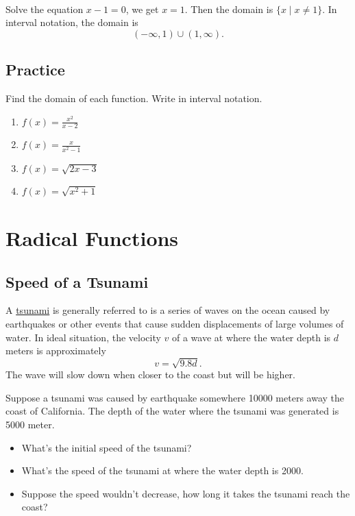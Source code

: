 \documentclass[en,11pt]{elegantbook}
\newcommand{\size}[2]{{\fontsize{#1}{0}\selectfont#2}}
\newenvironment{rmdthink}{
	\vspace*{0.5\baselineskip}
	\par\noindent
	\makebox[-4pt][r]{\color{green!90}\size{12}{\faLightbulbO}\,\,}
    \begin{tcolorbox}[
    enhanced,
    title={\textbf{\color{second}Think}},
    title style={left color=blue!10!green!20!white,right color=yellow!20!blue!20!white},
    colback=green!20!white,
    ]
    \sffamily
}{
    \end{tcolorbox}
	\par\ignorespacesafterend
}
\let\BeginKnitrBlock\begin \let\EndKnitrBlock\end
\begin{document}
\BeginKnitrBlock{solution}
{}\\

Solve the equation \(x-1=0\), we get \(x=1\). Then the domain is \(\{x\mid x\neq 1\}\). In interval notation, the domain is
\[
(-\infty, 1)\cup (1,\infty).
\]
\EndKnitrBlock{solution}

\newpage

\hypertarget{practice-13}{%
\section{Practice}\label{practice-13}}

\BeginKnitrBlock{exercise}
\protect\hypertarget{exr:unnamed-chunk-273}{}{\label{exr:unnamed-chunk-273} }
Find the domain of each function. Write in interval notation.

\begin{enumerate}
\def\labelenumi{\arabic{enumi}.}

\item
  \(f(x)=\frac{x^2}{x-2}\)
\item
  \(f(x)=\frac{x}{x^2-1}\)
\item
  \(f(x)=\sqrt{2x-3}\)
\item
  \(f(x)=\sqrt{x^2+1}\)\hfill\null
\end{enumerate}
\EndKnitrBlock{exercise}

\hypertarget{radical-functions}{%
\chapter{Radical Functions}\label{radical-functions}}

\hypertarget{speed-of-a-tsunami}{%
\section{Speed of a Tsunami}\label{speed-of-a-tsunami}}

\begin{rmdthink}

A \href{https://en.wikipedia.org/wiki/Tsunami}{tsunami} is generally referred to is a series of waves on the ocean caused by earthquakes or other events that cause sudden displacements of large volumes of water. In ideal situation, the velocity \(v\) of a wave at where the water depth is \(d\) meters is approximately
\[
v=\sqrt{9.8d}.
\]
The wave will slow down when closer to the coast but will be higher.

Suppose a tsunami was caused by earthquake somewhere 10000 meters away the coast of California. The depth of the water where the tsunami was generated is 5000 meter.

\begin{itemize}

\item
  What's the initial speed of the tsunami?
\item
  What's the speed of the tsunami at where the water depth is 2000.
\item
  Suppose the speed wouldn't decrease, how long it takes the tsunami reach the coast?
\end{itemize}

\end{rmdthink}
\end{document}
